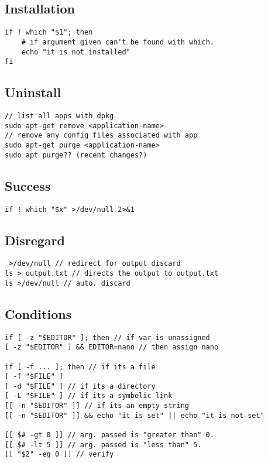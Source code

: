\subsection{Installation}

\begin{verbatim}
if ! which "$1"; then
    # if argument given can't be found with which. 
    echo "it is not installed"
fi
\end{verbatim}

\subsection{Uninstall}

\begin{verbatim}
// list all apps with dpkg
sudo apt-get remove <application-name>
// remove any config files associated with app
sudo apt-get purge <application-name>
sudo apt purge?? (recent changes?) 
\end{verbatim}

\subsection{Success}

\begin{verbatim}
if ! which "$x" >/dev/null 2>&1
\end{verbatim}

\subsection{Disregard}

\begin{verbatim}
 >/dev/null // redirect for output discard
ls > output.txt // directs the output to output.txt
ls >/dev/null // auto. discard
\end{verbatim}

\subsection{Conditions}

\begin{verbatim}
if [ -z "$EDITOR" ]; then // if var is unassigned
[ -z "$EDITOR" ] && EDITOR=nano // then assign nano

if [ -f ... ]; then // if its a file
[ -f "$FILE" ] 
[ -d "$FILE" ] // if its a directory
[ -L "$FILE" ] // if its a symbolic link 
[[ -n "$EDITOR" ]] // if its an empty string
[[ -n "$EDITOR" ]] && echo "it is set" || echo "it is not set"

[[ $# -gt 0 ]] // arg. passed is "greater than" 0.
[[ $# -lt 5 ]] // arg. passed is "less than" 5.
[[ "$2" -eq 0 ]] // verify 
\end{verbatim}

